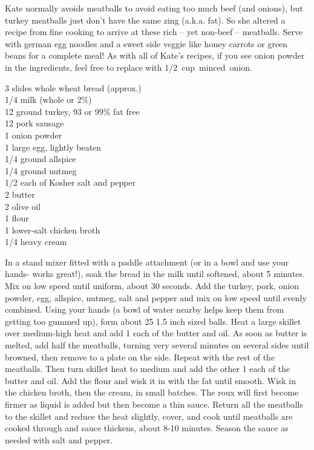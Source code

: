 \begin{open}
Kate normally avoids meatballs to avoid eating too much beef (and onions), but turkey meatballs just don't have the same zing (a.k.a. fat). So she altered a recipe from fine cooking to arrive at these rich -- yet non-beef -- meatballs. Serve with german egg noodles and a sweet side veggie like honey carrots or green beans for a complete meal! As with all of Kate's recipes, if you see onion powder in the ingredients, feel free to replace with \SI{1/2}cup minced onion.
\end{open}
\begin{ingredients}
    3 slides whole wheat bread (approx.)\\
    \SI{1/4}{\cup} milk (whole or 2\%) \\
    \SI{12}{\ounce} ground turkey, 93 or 99\% fat free\\
    \SI{12}{\ounce} pork sausage\\
    \SI{1}{\teaspoon} onion powder\\
    1 large egg, lightly beaten\\
    \SI{1/4}{\teaspoon} ground allspice\\
    \SI{1/4}{\teaspoon} ground nutmeg\\
    \SI{1/2}{\teaspoon} each of Kosher salt and pepper\\
    \SI{2}{\tblspoon} butter\\
    \SI{2}{\tblspoon} olive oil\\
    \SI{1}{\tblspoon} flour\\
    \SI{1}{\cup} lower-salt chicken broth\\
    \SI{1/4}{\cup} heavy cream\\
\end{ingredients}

In a stand mixer fitted with a paddle attachment (or in a bowl and use your hands- works great!), soak the bread in the milk until softened, about 5 minutes. Mix on low speed until uniform, about 30 seconds. Add the turkey, pork, onion powder, egg, allspice, nutmeg, salt and pepper and mix on low speed until evenly combined. Using your hands (a bowl of water nearby helps keep them from getting too gummed up), form about 25 1.5 inch sized balls. Heat a large skillet over medium-high heat and add \SI{1}{\tblspoon} each of the butter and oil. As soon as butter is melted, add half the meatballs, turning very several minutes on several sides until browned, then remove to a plate on the side. Repeat with the rest of the meatballs. Then turn skillet heat to medium and add the other \SI{1}{\tblspoon} each of the butter and oil. Add the flour and wisk it in with the fat until smooth. Wisk in the chicken broth, then the cream, in small batches. The roux will first become firmer as liquid is added but then become a thin sauce. Return all the meatballs to the skillet and reduce the heat slightly, cover, and cook until meatballs are cooked through and sauce thickens, about 8-10 minutes. Season the sauce as needed with salt and pepper.  

